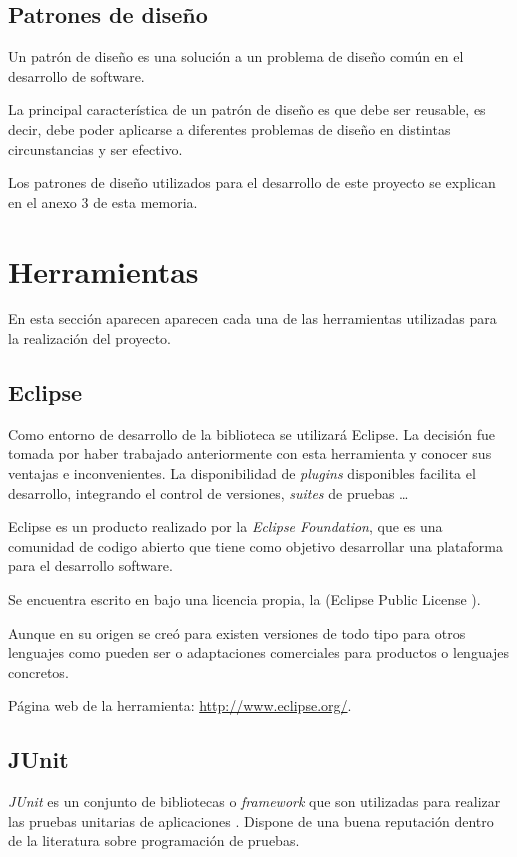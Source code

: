 \subsection{Patrones de diseño}
Un patrón de diseño es una solución a un problema de diseño común en el desarrollo de software.

La principal característica de un patrón de diseño es que debe ser reusable, es decir, debe poder aplicarse a diferentes problemas de diseño en distintas circunstancias y ser efectivo.

Los patrones de diseño utilizados para el desarrollo de este proyecto se explican en el anexo 3 de esta memoria.



\section{Herramientas}
En esta sección aparecen aparecen cada una de las herramientas utilizadas para la realización del proyecto.


\subsection{Eclipse}
Como entorno de desarrollo de la biblioteca se utilizará Eclipse. La decisión fue tomada por haber trabajado anteriormente con esta herramienta y conocer sus ventajas e inconvenientes. La disponibilidad de \textit{plugins} disponibles facilita el desarrollo, integrando el control de versiones, \textit{suites} de pruebas \dots

Eclipse es un producto realizado por la \textit{Eclipse Foundation}, que es una comunidad de codigo abierto que tiene como objetivo desarrollar una plataforma para el desarrollo software.

Se encuentra escrito en \java{} bajo una licencia propia, la \epl{} (Eclipse Public License ).

Aunque en su origen se creó para \java{} existen versiones de todo tipo para otros lenguajes como pueden ser \clang{} o adaptaciones comerciales para productos o lenguajes concretos.

Página web de la herramienta: \url{http://www.eclipse.org/}.


\subsection{JUnit}
\textit{JUnit} es un conjunto de bibliotecas o \textit{framework} que son utilizadas para realizar las pruebas unitarias de aplicaciones \java{}. Dispone de una buena reputación dentro de la literatura sobre programación de pruebas.

